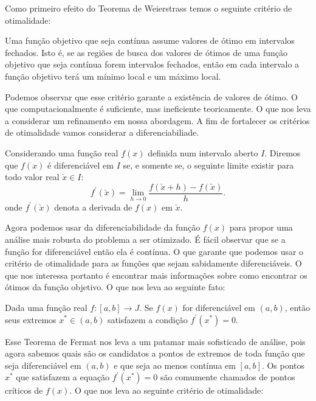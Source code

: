 \par Como primeiro efeito do Teorema de Weierstrass temos o seguinte critério de otimalidade:

\begin{theorem}
  Uma função objetivo que seja contínua assume valores de ótimo em intervalos fechados. Isto é, se as regiões de busca dos valores de ótimos de uma função objetivo que seja contínua forem intervalos fechados, então em cada intervalo a função objetivo terá um mínimo local e um máximo local. 
\end{theorem}


\par Podemos observar que esse critério garante a existência de valores de ótimo. O que computacionalmente é suficiente, mas ineficiente teoricamente. O que nos leva a considerar um refinamento em nossa abordagem. A fim de fortalecer os critérios de otimalidade vamos considerar a diferenciabiliade. 

\begin{definition}
  Considerando uma função real $f(x)$ definida num intervalo aberto $I$. Diremos que $f(x)$ é diferenciável em $I$ se, e somente se, o seguinte limite existir para todo valor real $\check{x} \in I$:
  $$ f^{'}(\check{x})= \lim_{h \rightarrow 0}\frac{f(\check{x}+h)- f(\check{x})}{h}.$$ 
  onde $f^{'}(\check{x})$ denota a derivada de $f(x)$ em $\check{x}$.
\end{definition}

\par Agora podemos usar da diferenciabilidade da função $f(x)$ para propor uma análise mais robusta do problema a ser otimizado. É fácil observar que se a função for diferenciável então ela é contínua. O que garante que podemos usar o critério de otimalidade para as funções que sejam sabidamente diferenciáveis. O que nos interessa portanto é encontrar mais informações sobre como encontrar os ótimos da função objetivo. O que nos leva ao seguinte fato:

\begin{theorem}
  Dada uma função real $f:[a,b] \rightarrow J$. Se $f(x)$ for diferenciável em $(a,b)$, então seus extremos $x^{*} \in (a,b)$ satisfazem a condição $f^{'}(x^*) = 0$. 
\end{theorem}

\par Esse Teorema de Fermat nos leva a um patamar mais sofisticado de análise, pois agora sabemos quais são os candidatos a pontos de extremos de toda função que seja diferenciável em $(a,b)$ e que seja ao menos contínua em $[a,b]$. Os pontos $x^{*}$ que satisfazem a equação $f^{'}(x^*) = 0$ são comumente chamados de pontos críticos de $f(x)$. O que nos leva ao seguinte critério de otimalidade:

